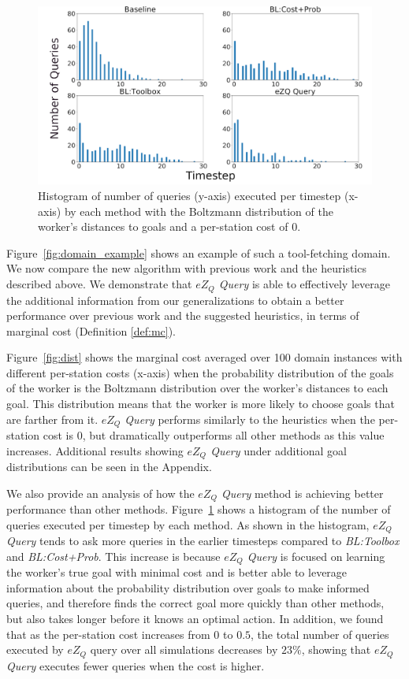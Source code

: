 \documentclass[letterpaper]{article}
\begin{document}
\begin{figure}[t]
    \centering
    \includegraphics[width=\linewidth]{Figures/Boltzmann_Positive_hist_c0_subfigures.png}
    \vspace{-5mm}
    \caption{Histogram of number of queries (y-axis) executed per timestep (x-axis) by each method with the Boltzmann distribution of the worker's distances to goals and a per-station cost of 0.}
    \label{fig:hist}
\end{figure}

Figure~\ref{fig:domain_example} shows an example of such a tool-fetching domain. We now compare the new algorithm with previous work and the heuristics described above. We demonstrate that \emph{$eZ_Q$ Query} is able to effectively leverage the additional information from our generalizations to obtain a better performance over previous work and the suggested heuristics, in terms of marginal cost (Definition \ref{def:mc}). 

Figure~\ref{fig:dist} shows the marginal cost averaged over 100 domain instances with different per-station costs (x-axis) when the probability distribution of the goals of the worker is the Boltzmann distribution over the worker's distances to each goal. This distribution means that the worker is more likely to choose goals that are farther from it. \emph{$eZ_Q$ Query} performs similarly to the heuristics when the per-station cost is 0, but dramatically outperforms all other methods as this value increases.
Additional results showing \emph{$eZ_Q$ Query} under additional goal distributions can be seen in the Appendix.

We also provide an analysis of how the \emph{$eZ_Q$ Query} method is achieving better performance than other methods. Figure~\ref{fig:hist} shows a histogram of the number of queries executed per timestep by each method. As shown in the histogram, \emph{$eZ_Q$ Query} tends to ask more queries in the earlier timesteps compared to \emph{BL:Toolbox} and \emph{BL:Cost+Prob}. This increase is because \emph{$eZ_Q$ Query} is focused on learning the worker's true goal with minimal cost and is better able to leverage information about the probability distribution over goals to make informed queries, and therefore finds the correct goal more quickly than other methods, but also takes longer before it knows an optimal action.
In addition, we found that as the per-station cost increases from $0$ to $0.5$, the total number of queries executed by $eZ_Q$ query over all simulations decreases by $23\%$, showing that \emph{$eZ_Q$ Query} executes fewer queries when the cost is higher.
\end{document}
